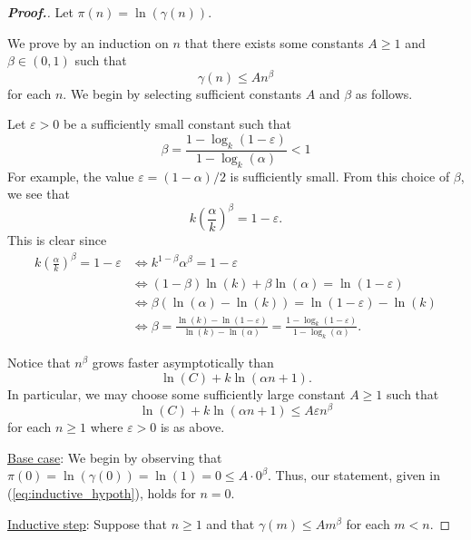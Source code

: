\documentclass[11pt,a4paper,reqno]{amsart}
\theoremstyle{plain}
\theoremstyle{definition}
\theoremstyle{definition}
\newenvironment{myproof}{\begin{proof}[\normalfont\bfseries Proof.]}{\end{proof}}
\renewcommand\leq\leqslant
\renewcommand\geq\geqslant
\begin{document}
\begin{myproof}
Let $\pi(n) = \ln(\gamma(n))$.

We prove by an induction on $n$ that there exists some constants $A \geq 1$ and $\beta\in (0,1)$ such that
\begin{equation}\label{eq:inductive_hypoth}
\gamma(n) \leq A n^\beta
\end{equation}
for each $n$.
We begin by selecting sufficient constants $A$ and $\beta$ as follows.

Let $\varepsilon>0$ be a sufficiently small constant such that
\begin{equation}\label{eq:upper/beta}
  \beta
  =
  \frac{1-\log_k(1-\varepsilon)}{1-\log_k(\alpha)} < 1
\end{equation}
For example, the value $\varepsilon = (1-\alpha)/2$ is sufficiently small.
From this choice of $\beta$, we see that
\begin{equation}\label{eq:upper/bound}
  k
  \left(
    \frac{\alpha}{k}
  \right)^\beta
  = 1-\varepsilon.
\end{equation}
This is clear since
\begin{align*}
  k
  \left(
    \frac{\alpha}{k}
  \right)^\beta
  = 1-\varepsilon
  &\iff
  k^{1-\beta}
  \alpha^\beta
  = 1-\varepsilon
  \\
  &\iff
  (1-\beta)\ln(k) + \beta \ln(\alpha) = \ln(1-\varepsilon)
  \\
  &\iff
  \beta (\ln(\alpha)-\ln(k)) = \ln(1-\varepsilon) -\ln(k)
  \\
  &\iff
\beta = \frac{\ln(k)-\ln(1-\varepsilon)}{\ln(k)-\ln(\alpha)}
=
\frac{1-\log_k(1-\varepsilon)}{1-\log_k(\alpha)}.
\end{align*}

Notice that $n^\beta$ grows faster asymptotically than
\[
  \ln(C)+k\ln(\alpha n +1).
\]
In particular, we may choose some sufficiently large constant $A \geq 1$ such that
\begin{equation}\label{eq:upper/A}
  \ln(C)+k\ln(\alpha n +1) \leq A\varepsilon n^\beta
\end{equation}
for each $n\geq 1$
where $\varepsilon>0$ is as above.

\medskip
\noindent
\underline{Base case}:
We begin by observing that $\pi(0) = \ln(\gamma(0)) = \ln(1)=0 \leq A\cdot 0^\beta$.
Thus, our statement, given in (\ref{eq:inductive_hypoth}), holds for $n=0$.

\medskip
\noindent
\underline{Inductive step}:
%
Suppose that $n \geq 1$ and that $\gamma(m) \leq A m^\beta$ for each $m < n$.


\end{myproof}
\end{document}
